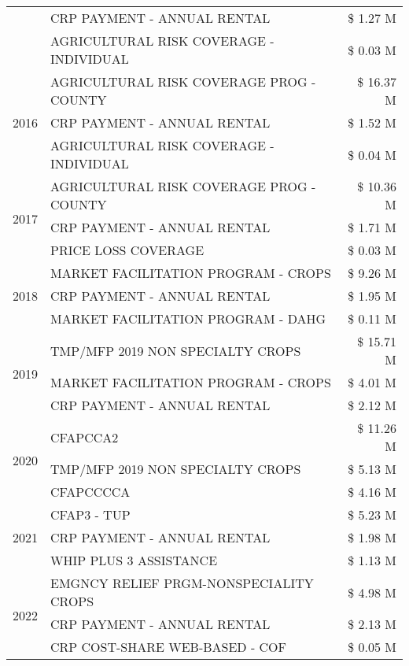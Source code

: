\begin{tabular}{llr}
 & CRP PAYMENT - ANNUAL RENTAL & \$ 1.27 M \\
 & AGRICULTURAL RISK COVERAGE - INDIVIDUAL & \$ 0.03 M \\
\cline{1-3}
\multirow[t]{3}{*}{2016} & AGRICULTURAL RISK COVERAGE PROG - COUNTY & \$ 16.37 M \\
 & CRP PAYMENT - ANNUAL RENTAL & \$ 1.52 M \\
 & AGRICULTURAL RISK COVERAGE - INDIVIDUAL & \$ 0.04 M \\
\cline{1-3}
\multirow[t]{3}{*}{2017} & AGRICULTURAL RISK COVERAGE PROG - COUNTY & \$ 10.36 M \\
 & CRP PAYMENT - ANNUAL RENTAL & \$ 1.71 M \\
 & PRICE LOSS COVERAGE & \$ 0.03 M \\
\cline{1-3}
\multirow[t]{3}{*}{2018} & MARKET FACILITATION PROGRAM - CROPS & \$ 9.26 M \\
 & CRP PAYMENT - ANNUAL RENTAL & \$ 1.95 M \\
 & MARKET FACILITATION PROGRAM - DAHG & \$ 0.11 M \\
\cline{1-3}
\multirow[t]{3}{*}{2019} & TMP/MFP 2019 NON SPECIALTY CROPS & \$ 15.71 M \\
 & MARKET FACILITATION PROGRAM - CROPS & \$ 4.01 M \\
 & CRP PAYMENT - ANNUAL RENTAL & \$ 2.12 M \\
\cline{1-3}
\multirow[t]{3}{*}{2020} & CFAPCCA2 & \$ 11.26 M \\
 & TMP/MFP 2019 NON SPECIALTY CROPS & \$ 5.13 M \\
 & CFAPCCCCA & \$ 4.16 M \\
\cline{1-3}
\multirow[t]{3}{*}{2021} & CFAP3 - TUP & \$ 5.23 M \\
 & CRP PAYMENT - ANNUAL RENTAL & \$ 1.98 M \\
 & WHIP PLUS 3 ASSISTANCE & \$ 1.13 M \\
\cline{1-3}
\multirow[t]{3}{*}{2022} & EMGNCY RELIEF PRGM-NONSPECIALITY CROPS & \$ 4.98 M \\
 & CRP PAYMENT - ANNUAL RENTAL & \$ 2.13 M \\
 & CRP COST-SHARE WEB-BASED - COF & \$ 0.05 M \\
\cline{1-3}
\bottomrule
\end{tabular}
